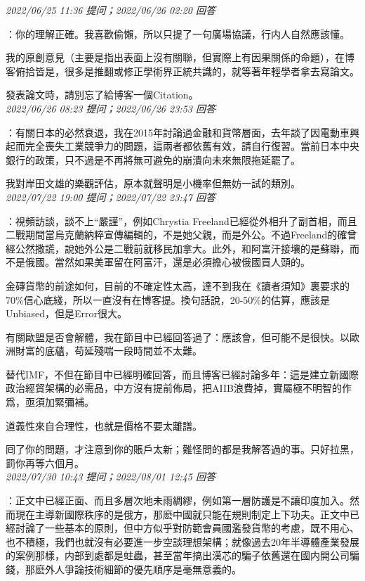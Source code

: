 \documentclass[twocolumn]{ctexart}
\begin{document}
\textit{\hfill\noindent\small 2022/06/25 11:36 提问；2022/06/26 02:20 回答}

：你的理解正確。我喜歡偷懶，所以只提了一句廣場協議，行内人自然應該懂。

我的原創意見（主要是指出表面上沒有關聯，但實際上有因果關係的命題），在博客俯拾皆是，很多是推翻或修正學術界正統共識的，就等著年輕學者拿去寫論文。

發表論文時，請別忘了給博客一個Citation。
\\

\textit{\hfill\noindent\small 2022/06/26 08:23 提问；2022/06/26 23:53 回答}

：有關日本的必然衰退，我在2015年討論過金融和貨幣層面，去年談了因電動車興起而完全喪失工業競爭力的問題，這兩者都依舊有效，請自行復習。當前日本中央銀行的政策，只不過是不再將無可避免的崩潰向未來無限拖延罷了。

我對岸田文雄的樂觀評估，原本就聲明是小機率但無妨一試的類別。
\\

\textit{\hfill\noindent\small 2022/07/22 19:00 提问；2022/07/22 23:47 回答}

：視頻訪談，談不上“嚴謹”，例如Chrystia Freeland已經從外相升了副首相，而且二戰期間當烏克蘭納粹宣傳編輯的，不是她父親，而是外公。不過Freeland的確曾經公然撒謊，說她外公是二戰前就移民加拿大。此外，和阿富汗接壤的是蘇聯，而不是俄國。當然如果美軍留在阿富汗，還是必須擔心被俄國買人頭的。

金磚貨幣的前途如何，目前的不確定性太高，達不到我在《讀者須知》裏要求的70\%信心底綫，所以一直沒有在博客提。換句話說，20-50\%的估算，應該是Unbiased，但是Error很大。

有關歐盟是否會解體，我在節目中已經回答過了：應該會，但可能不是很快。以歐洲財富的底蘊，苟延殘喘一段時間並不太難。

替代IMF，不但在節目中已經明確回答，而且博客已經討論多年：這是建立新國際政治經貿架構的必需品，中方沒有提前佈局，把AIIB浪費掉，實屬極不明智的作爲，亟須加緊彌補。

道義性來自合理性，也就是價格不要太離譜。


囘了你的問題，才注意到你的賬戶太新；難怪問的都是我解答過的事。只好拉黑，罰你再等六個月。
\\

\textit{\hfill\noindent\small 2022/07/30 10:43 提问；2022/08/01 12:45 回答}

：正文中已經正面、而且多層次地未雨綢繆，例如第一層防護是不讓印度加入。然而現在主導新國際秩序的是俄方，那麽中國就只能在規則制定上下功夫。正文中已經討論了一些基本的原則，但中方似乎對防範會員國濫發貨幣的考慮，既不用心、也不積極，我們也就沒有必要進一步空談理想架構；就像過去20年半導體產業發展的案例那樣，内部到處都是蛀蟲，甚至當年搞出漢芯的騙子依舊還在國内開公司騙錢，那麽外人爭論技術細節的優先順序是毫無意義的。
\\
\end{document}
